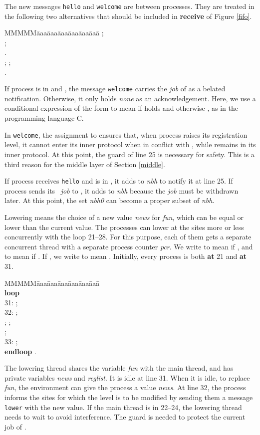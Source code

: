\documentclass[10pt]{article} \usepackage[english]{babel}
\newenvironment{tab}{\begin{tabbing}
MMMMM\=aaa\=aaa\=aaa\=aaa\=aaa\=aaa\= \kill}{\end{tabbing}}
\def\S #1/{\mbox {\textsl{#1}}}
\def\B #1/{\mbox {\textbf{#1}}}
\def\T #1/{\mbox {\texttt{#1}}}
\begin{document}
The new messages \T hello/ and \T welcome/ are between processes.
They are treated in the following two alternatives that should be
included in \B receive/ of Figure \ref{fifo}.
\begin{tab}
\>\+  \>  ; \\
\>  ;\\
\>  .\\
 \>  ;  ;\\
\>  .
\end{tab}
If process  is in  and , the message
\T welcome/ carries the \S job/ of  as a belated notification.
Otherwise, it only holds \S none/ as an acknowledgement.  Here, we use
a conditional expression of the form  to mean  if 
holds and otherwise , as in the programming language C.

In \T welcome/, the assignment to  ensures that, when
process  raises its registration level, it cannot enter its inner
protocol when in conflict with , while  remains in its inner
protocol.  At this point, the guard of line 25 is necessary for
safety.  This is a third reason for the middle layer of Section
\ref{middle}.

If process  receives \T hello/ and is in , it adds
 to \S nbh/ to notify it at line 25.  If process  sends its \S
job/ to , it adds  to \S nbh/ because the \S job/ must be
withdrawn later.  At this point, the set \S nbh0/ can become a proper
subset of \S nbh/.

Lowering means the choice of a new value \S news/ for \S fun/, which
can be equal or lower than the current value.  The processes can lower
at the sites more or less concurrently with the loop 21--28. For this
purpose, each of them gets a separate concurrent thread with a
separate process counter \S pcr/. We write  to mean  if , and to mean 
if .  If , we write
 to mean .  Initially, every
process is both \B at/ 21 and \B at/ 31.

\begin{tab}
  \>\+ \\
  \B loop/\\
  31: \>\>  ;\\
  32: \>\>  ;\\
  \>\>  ;
   ; \\
  \>\>  ; \\
  33: \>\>  ;\\
  \B endloop/ .
\end{tab}

The lowering thread shares the variable \S fun/ with the main thread,
and has private variables \S news/ and \S reglist/.  It is idle at
line 31.  When it is idle, to replace \S fun/, the environment can
give the process a value \S news/.  At line 32, the process informs
the sites  for which the level is to be modified by sending them a
message \T lower/ with the new value.  If the main thread is in
22--24, the lowering thread needs to wait to avoid interference.  The
guard  is needed to protect the current job
of . 
\end{document}
